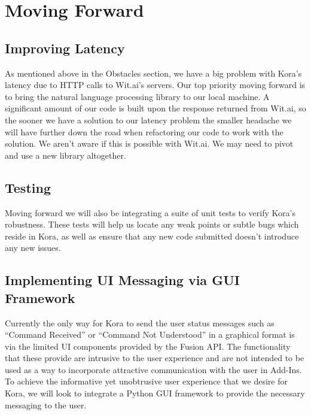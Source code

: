 \documentclass[onecolumn, draftclsnofoot,10pt, compsoc]{IEEEtran}
\begin{document}
		
\section{Moving Forward}

    \subsection{Improving Latency}
    As mentioned above in the Obstacles section, we have a big problem with Kora's latency due to HTTP calls to Wit.ai's servers.
    Our top priority moving forward is to bring the natural language processing library to our local machine.
    A significant amount of our code is built upon the response returned from Wit.ai, so the sooner we have a solution to our latency problem the smaller headache we will have further down the road when refactoring our code to work with the solution.
    We aren't aware if this is possible with Wit.ai.
    We may need to pivot and use a new library altogether.
    
    \subsection{Testing}
    Moving forward we will also be integrating a suite of unit tests to verify Kora's robustness.
    These tests will help us locate any weak points or subtle bugs which reside in Kora, as well as ensure that any new code submitted doesn't introduce any new issues.

    \subsection{Implementing UI Messaging via GUI Framework}	
    Currently the only way for Kora to send the user status messages such as “Command Received” or “Command Not Understood” in a graphical format is via the limited UI components provided by the Fusion API.
    The functionality that these provide are intrusive to the user experience and are not intended to be used as a way to incorporate attractive communication with the user in Add-Ins.
    To achieve the informative yet unobtrusive user experience that we desire for Kora, we will look to integrate a Python GUI framework to provide the necessary messaging to the user.
\end{document}

